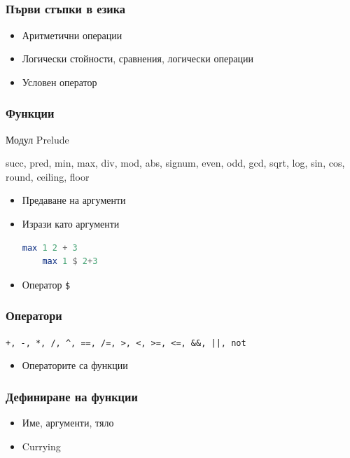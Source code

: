 \documentclass{beamer}
\begin{document}
\subsection{}

\begin{frame}[fragile]
  \frametitle{Първи стъпки в езика}
  \begin{itemize}
    \item Аритметични операции
    \item Логически стойности, сравнения, логически операции
    \item Условен оператор
  \end{itemize}
\end{frame}

\begin{frame}[fragile]
  \frametitle{Функции}

  Модул Prelude

  \bigskip

  succ, pred, min, max, div, mod, abs, signum, even, odd, gcd, sqrt, log, sin, cos, round, ceiling, floor

  \bigskip

  \begin{itemize}
    \item Предаване на аргументи
    \item Изрази като аргументи
    \begin{lstlisting}[basicstyle=\small, language=Haskell]
    max 1 2 + 3
    max 1 $ 2+3
    \end{lstlisting}
    \item Оператор \verb|$|
  \end{itemize}
\end{frame}


\begin{frame}[fragile]
  \frametitle{Оператори}

  \verb#+, -, *, /, ^, ==, /=, >, <, >=, <=, &&, ||, not#

  \bigskip

  \begin{itemize}
    \item Операторите са функции
  \end{itemize}
\end{frame}


\begin{frame}[fragile]
  \frametitle{Дефиниране на функции}

  \begin{itemize}
    \item Име, аргументи, тяло
    \item Currying
  \end{itemize}
\end{frame}
\end{document}
